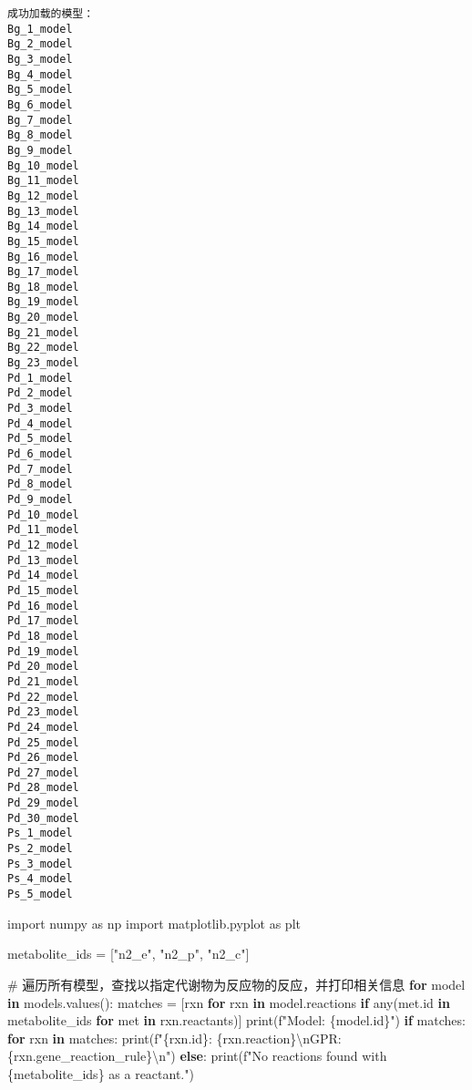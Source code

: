 \documentclass[
  letterpaper,
  DIV=11,
  numbers=noendperiod]{scrartcl}
\newenvironment{Shaded}{\begin{snugshade}}{\end{snugshade}}
\newcommand{\BuiltInTok}[1]{\textcolor[rgb]{0.00,0.23,0.31}{#1}}
\newcommand{\CharTok}[1]{\textcolor[rgb]{0.13,0.47,0.30}{#1}}
\newcommand{\CommentTok}[1]{\textcolor[rgb]{0.37,0.37,0.37}{#1}}
\newcommand{\ControlFlowTok}[1]{\textcolor[rgb]{0.00,0.23,0.31}{\textbf{#1}}}
\newcommand{\ImportTok}[1]{\textcolor[rgb]{0.00,0.46,0.62}{#1}}
\newcommand{\KeywordTok}[1]{\textcolor[rgb]{0.00,0.23,0.31}{\textbf{#1}}}
\newcommand{\NormalTok}[1]{\textcolor[rgb]{0.00,0.23,0.31}{#1}}
\newcommand{\OperatorTok}[1]{\textcolor[rgb]{0.37,0.37,0.37}{#1}}
\newcommand{\SpecialCharTok}[1]{\textcolor[rgb]{0.37,0.37,0.37}{#1}}
\newcommand{\SpecialStringTok}[1]{\textcolor[rgb]{0.13,0.47,0.30}{#1}}
\newcommand{\StringTok}[1]{\textcolor[rgb]{0.13,0.47,0.30}{#1}}
\begin{document}
\begin{verbatim}
成功加载的模型：
Bg_1_model
Bg_2_model
Bg_3_model
Bg_4_model
Bg_5_model
Bg_6_model
Bg_7_model
Bg_8_model
Bg_9_model
Bg_10_model
Bg_11_model
Bg_12_model
Bg_13_model
Bg_14_model
Bg_15_model
Bg_16_model
Bg_17_model
Bg_18_model
Bg_19_model
Bg_20_model
Bg_21_model
Bg_22_model
Bg_23_model
Pd_1_model
Pd_2_model
Pd_3_model
Pd_4_model
Pd_5_model
Pd_6_model
Pd_7_model
Pd_8_model
Pd_9_model
Pd_10_model
Pd_11_model
Pd_12_model
Pd_13_model
Pd_14_model
Pd_15_model
Pd_16_model
Pd_17_model
Pd_18_model
Pd_19_model
Pd_20_model
Pd_21_model
Pd_22_model
Pd_23_model
Pd_24_model
Pd_25_model
Pd_26_model
Pd_27_model
Pd_28_model
Pd_29_model
Pd_30_model
Ps_1_model
Ps_2_model
Ps_3_model
Ps_4_model
Ps_5_model
\end{verbatim}

\begin{Shaded}
\begin{Highlighting}[]
\ImportTok{import}\NormalTok{ numpy }\ImportTok{as}\NormalTok{ np}
\ImportTok{import}\NormalTok{ matplotlib.pyplot }\ImportTok{as}\NormalTok{ plt}

\NormalTok{metabolite\_ids }\OperatorTok{=}\NormalTok{ [}\StringTok{"n2\_e"}\NormalTok{, }\StringTok{"n2\_p"}\NormalTok{, }\StringTok{"n2\_c"}\NormalTok{]}

\CommentTok{\# 遍历所有模型，查找以指定代谢物为反应物的反应，并打印相关信息}
\ControlFlowTok{for}\NormalTok{ model }\KeywordTok{in}\NormalTok{ models.values():}
\NormalTok{    matches }\OperatorTok{=}\NormalTok{ [rxn }\ControlFlowTok{for}\NormalTok{ rxn }\KeywordTok{in}\NormalTok{ model.reactions }
               \ControlFlowTok{if} \BuiltInTok{any}\NormalTok{(met.}\BuiltInTok{id} \KeywordTok{in}\NormalTok{ metabolite\_ids }\ControlFlowTok{for}\NormalTok{ met }\KeywordTok{in}\NormalTok{ rxn.reactants)]}
    \BuiltInTok{print}\NormalTok{(}\SpecialStringTok{f"Model: }\SpecialCharTok{\{}\NormalTok{model}\SpecialCharTok{.}\BuiltInTok{id}\SpecialCharTok{\}}\SpecialStringTok{"}\NormalTok{)}
    \ControlFlowTok{if}\NormalTok{ matches:}
        \ControlFlowTok{for}\NormalTok{ rxn }\KeywordTok{in}\NormalTok{ matches:}
            \BuiltInTok{print}\NormalTok{(}\SpecialStringTok{f"}\SpecialCharTok{\{}\NormalTok{rxn}\SpecialCharTok{.}\BuiltInTok{id}\SpecialCharTok{\}}\SpecialStringTok{: }\SpecialCharTok{\{}\NormalTok{rxn}\SpecialCharTok{.}\NormalTok{reaction}\SpecialCharTok{\}}\CharTok{\textbackslash{}n}\SpecialStringTok{GPR: }\SpecialCharTok{\{}\NormalTok{rxn}\SpecialCharTok{.}\NormalTok{gene\_reaction\_rule}\SpecialCharTok{\}}\CharTok{\textbackslash{}n}\SpecialStringTok{"}\NormalTok{)}
    \ControlFlowTok{else}\NormalTok{:}
        \BuiltInTok{print}\NormalTok{(}\SpecialStringTok{f"No reactions found with }\SpecialCharTok{\{}\NormalTok{metabolite\_ids}\SpecialCharTok{\}}\SpecialStringTok{ as a reactant."}\NormalTok{)}


\end{Highlighting}
\end{Shaded}
\end{document}
